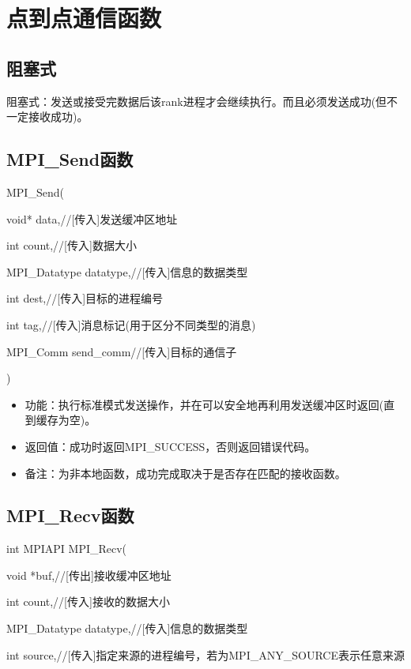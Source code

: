 \documentclass[UTF8]{article}%
\begin{document}
\section{点到点通信函数}

\subsection{阻塞式}

阻塞式：发送或接受完数据后该rank进程才会继续执行。而且必须发送成功(但不一定接收成功)。

\subsection{MPI\_Send函数}

MPI\_Send(

    \qquad void* data,//[传入]发送缓冲区地址

    \qquad int count,//[传入]数据大小

    \qquad MPI\_Datatype datatype,//[传入]信息的数据类型

    \qquad int dest,//[传入]目标的进程编号

    \qquad int tag,//[传入]消息标记(用于区分不同类型的消息)

    \qquad MPI\_Comm send\_comm//[传入]目标的通信子
    
    )

\begin{itemize}
    \item 功能：执行标准模式发送操作，并在可以安全地再利用发送缓冲区时返回(直到缓存为空)。
    \item 返回值：成功时返回MPI\_SUCCESS，否则返回错误代码。
    \item 备注：为非本地函数，成功完成取决于是否存在匹配的接收函数。
\end{itemize}

\subsection{MPI\_Recv函数}

int MPIAPI MPI\_Recv(

    \qquad void            *buf,//[传出]接收缓冲区地址

    \qquad int             count,//[传入]接收的数据大小

    \qquad MPI\_Datatype   datatype,//[传入]信息的数据类型

    \qquad int             source,//[传入]指定来源的进程编号，若为MPI\_ANY\_SOURCE表示任意来源
\end{document}
